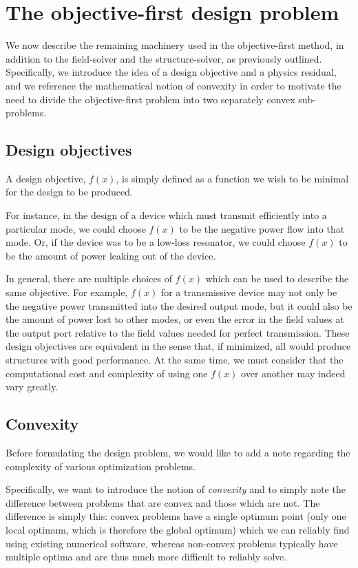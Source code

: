 
\section{The objective-first design problem}
We now describe the remaining machinery used in the objective-first method,
    in addition to the field-solver and the structure-solver,
    as previously outlined.
Specifically, we introduce the idea of a design objective and a physics residual,
    and we reference the mathematical notion of convexity
    in order to motivate the need to divide the 
    objective-first problem into two separately convex sub-problems.

\subsection{Design objectives} \label{sec:desobj}
A design objective, $f(x)$, is simply defined as
    a function we wish to be minimal 
    for the design to be produced.

For instance, in the design of a device
    which must transmit efficiently into a particular mode,
    we could choose $f(x)$ to be the negative power flow into that mode.
Or, if the device was to be a low-loss resonator,
    we could choose $f(x)$ to be the amount of power leaking 
    out of the device.

In general, there are multiple choices of $f(x)$
    which can be used to describe the same objective.
For example, $f(x)$ for a transmissive device 
    may not only be the negative power transmitted into the desired output mode,
    but it could also be the amount of power lost to other modes,
    or even the error in the field values at the output port
    relative to the field values needed for perfect transmission.
These design objectives are equivalent in the sense that, if minimized, 
    all would produce structures with good performance.
At the same time, we must consider that the computational cost and complexity
    of using one $f(x)$ over another may indeed vary greatly.

\subsection{Convexity}
Before formulating the design problem,
    we would like to add a note regarding the complexity of various 
    optimization problems.

Specifically, we want to introduce the notion of \emph{convexity}\cite{boyd}
    and to simply note the difference between problems that
    are convex and those which are not.
The difference is simply this:
    convex problems have a single optimum point
    (only one local optimum, which is therefore the global optimum)
    which we can reliably find using existing numerical software,
    whereas non-convex problems typically have multiple optima 
    and are thus much more difficult to reliably solve.

